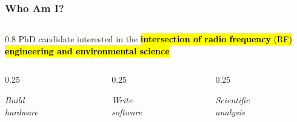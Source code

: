 \begin{frame}[label=self]
    \frametitle{Who Am I?}   
    \raggedright
    \begin{columns}
        \begin{column}{0.8\textwidth}
            PhD candidate interested in the \hl{\textbf{intersection of radio frequency} (RF) \textbf{engineering and environmental science}}
            \begin{columns}
                \begin{column}{0.25\linewidth}
                    \begin{tcolorbox}[width=0.9\linewidth, colframe=black, arc=0pt, outer arc=0pt, opacityback=1, boxsep=1pt, left=0pt, right=0pt]
                        \centering \textit{Build \\ hardware}
                    \end{tcolorbox} %
                \end{column}
                \begin{column}{0.25\textwidth}
                    \begin{tcolorbox}[width=0.9\linewidth, colframe=black, arc=0pt, outer arc=0pt, opacityback=1, boxsep=1pt, left=0pt, right=0pt]
                        \centering \textit{Write \\ software}
                    \end{tcolorbox} 
                \end{column}
                \begin{column}{0.25\textwidth}
                    \begin{tcolorbox}[width=0.9\linewidth, colframe=black, arc=0pt, outer arc=0pt, opacityback=1, boxsep=1pt, left=0pt, right=0pt]
                        \centering \textit{Scientific \\ analysis}
                    \end{tcolorbox}    
                \end{column}
            \end{columns}
            

\end{column}
\end{columns}
\end{frame}
